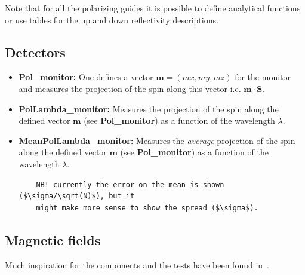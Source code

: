 Note that for all the polarizing guides it is possible to define analytical
functions or use tables for the up and down reflectivity descriptions.

\subsection{Detectors}

\begin{itemize}
\item \textbf{Pol\_monitor:} One defines a vector $\mathbf{m} = (mx,
  my, mz)$ for the monitor and measures the projection of the spin
  along this vector i.e. $\mathbf{m} \cdot \mathbf{S}$.\\

\item \textbf{PolLambda\_monitor:} Measures the projection of the
  spin along the defined vector $\mathbf{m}$ (see
  \textbf{Pol\_monitor}) as a function of the wavelength $\lambda$.

\item \textbf{MeanPolLambda\_monitor:} Measures the \emph{average}
  projection of the spin along the defined vector $\mathbf{m}$ (see
  \textbf{Pol\_monitor}) as a function of the wavelength $\lambda$.

  \begin{lstlisting}
    NB! currently the error on the mean is shown ($\sigma/\sqrt(N)$), but it
    might make more sense to show the spread ($\sigma$).
  \end{lstlisting}
\end{itemize}

\subsection{Magnetic fields}

Much inspiration for the components and the tests have been found
in~\cite{pol_seeger}.

